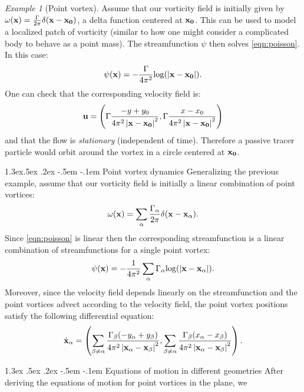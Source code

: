 \documentclass[10pt,oneside]{amsart}
\makeatletter
\def\section{\@startsection{section}{1}{0in}%
                                   {1.3ex \@plus .5ex \@minus .2ex}%
                                   {-.5em \@plus -.1em}%
                                   {\reset@font\normalsize\bfseries}}
\def\subsection{\@startsection{subsection}{2}{.25in}%
                                     {1.3ex\@plus .5ex \@minus .2ex}%
                                     {-.5em \@plus -.1em}%
                                     {\reset@font\normalsize\bfseries}}
\theoremstyle{definition}
\theoremstyle{remark}
\newtheorem*{ex}{Example}
\numberwithin{equation}{section}
\makeatother
\begin{document}
\begin{ex}[Point vortex] Assume that our vorticity field is initially given by $\omega({\bf x}) = \frac{\Gamma}{2 \pi} \delta ({\bf x} - {\bf x_0})$, a delta function centered at ${\bf x_0}$. This can be used to model a localized patch of vorticity (similar to how one might consider a complicated body to behave as a point mass). The streamfunction $\psi$ then solves \eqref{eqn:poisson}. In this case:
\begin{align*}
\psi({\bf x} ) = -\frac{\Gamma}{4 \pi^2} \mathrm{log}(\left | {\bf x} - {\bf x_0} \right |).
\end{align*}
One can check that the corresponding velocity field is:
\begin{align*}
{\bf u} = \left(\Gamma \frac{-y+y_0}{ 4 \pi^2\left | {\bf x} - {\bf x_0} \right |^2},\Gamma \frac{x - x_0}{4 \pi^2 \left | {\bf x} - {\bf x_0} \right |^2} \right) 
\end{align*}
and that the flow is {\it stationary} (independent of time). Therefore a passive tracer particle would orbit around the vortex in a circle centered at ${\bf x_0}$.
\end{ex}

\subsection{Point vortex dynamics} Generalizing the previous example, assume that our vorticity field is initially a linear combination of point vortices:
\begin{align*}
\omega({\bf x}) = \sum_{\alpha} \frac{\Gamma_\alpha}{2 \pi} \delta ({\bf x} - {\bf x_\alpha}).
\end{align*}
Since \eqref{eqn:poisson} is linear then the corresponding streamfunction is a linear combination of streamfunctions for a single point vortex:
\begin{align*}
\psi({\bf x}) = -\frac{1}{4 \pi^2} \sum_\alpha \Gamma_\alpha \mathrm{log}(\left | {\bf x} - {\bf x_\alpha} \right |).
\end{align*}
Moreover, since the velocity field depends linearly on the streamfunction and the point vortices advect according to the velocity field, the point vortex positions satisfy the following differential equation:
\begin{align}
\dot{{\bf x}}_\alpha = \left( \sum_{\beta \neq \alpha}\frac{\Gamma_\beta(-y_\alpha+y_\beta)}{4 \pi^2\left | {\bf x_\alpha} - {\bf x_\beta} \right |^2}, \sum_{\beta \neq \alpha}\frac{\Gamma_\beta(x_\alpha - x_\beta)}{4 \pi^2 \left | {\bf x_\alpha} - {\bf x_\beta} \right |^2} \right).
\end{align}

\section{Equations of motion in different geometries} After deriving the equations of motion for point vortices in the plane, we 


\end{document}
